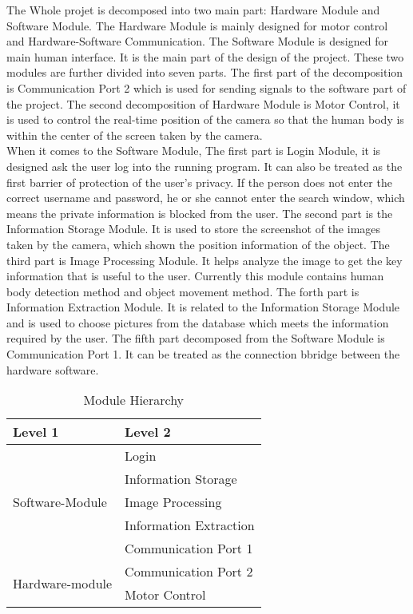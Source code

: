 \documentclass[12pt, titlepage]{article}
\begin{document}
The Whole projet is decomposed into two main part: Hardware Module and Software Module. The Hardware Module is mainly designed for motor control and Hardware-Software Communication. The Software Module is designed for main human interface. It is the main part of the design of the project. These two modules are further divided into seven parts. The first part of the decomposition is Communication Port 2 which is used for sending signals to the software part of the project. The second decomposition of Hardware Module is Motor Control, it is used to control the real-time position of the camera so that the human body is within the center of the screen taken by the camera.\\ 
When it comes to the Software Module, The first part is Login Module, it is designed ask the user log into the running program. It can also be treated as the first barrier of protection of the user's privacy. If the person does not enter the correct username and password, he or she cannot enter the search window, which means the private information is blocked from the user. The second part is the Information Storage Module. It is used to store the screenshot of the images taken by the camera, which shown the position information of the object. The third part is Image Processing Module. It helps analyze the image to get the key information that is useful to the user. Currently this module contains human body detection method and object movement method. The forth part is  Information Extraction Module. It is related to the Information Storage Module and is used to choose pictures from the database which meets the information required by the user. The fifth part decomposed from the Software Module is Communication Port 1. It can be treated as the connection bbridge between the hardware software. 

\begin{table}[H]
\centering
\begin{tabular}{p{} p{}}
\toprule
\textbf{Level 1} & \textbf{Level 2}\\
\midrule

\multirow{5}{0.3\textwidth}{Software-Module} & 
Login  \\
& Information Storage \\
& Image Processing \\
& Information Extraction \\
& Communication Port 1 \\
\midrule

\multirow{2}{0.3\textwidth}{Hardware-module} & Communication Port 2\\
& Motor Control\\


\bottomrule

\end{tabular}
\caption{Module Hierarchy}
\label{TblMH}
\end{table}
\end{document}
